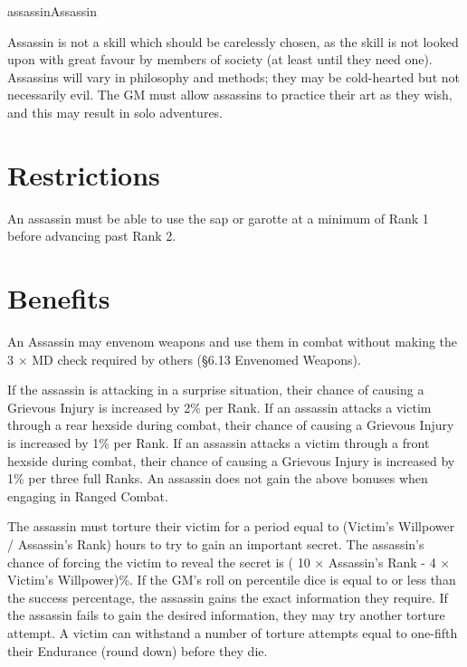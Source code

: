 \begin{Skill}{assassin}{Assassin}

Assassin is not a skill which should be carelessly chosen, as the
skill is not looked upon with great favour by members of society (at
least until they need one).  Assassins will vary in philosophy and
methods; they may be cold-hearted but not necessarily evil.  The GM
must allow assassins to practice their art as they wish, and this may
result in solo adventures.

\section{Restrictions}

An assassin must be able to use the sap or garotte at a minimum of
Rank 1 before advancing past Rank 2.

\section{Benefits}


An Assassin may envenom weapons and use them in combat without making
the 3 × MD check required by others (§6.13 Envenomed Weapons).


If the assassin is attacking in a surprise situation, their chance of
causing a Grievous Injury is increased by 2\% per Rank.  If an
assassin attacks a victim through a rear hexside during combat, their
chance of causing a Grievous Injury is increased by 1\% per Rank.  If
an assassin attacks a victim through a front hexside during combat,
their chance of causing a Grievous Injury is increased by 1\% per
three full Ranks. An assassin does not gain the above bonuses when
engaging in Ranged Combat.



The assassin must torture their victim for a period equal to (Victim’s
Willpower / Assassin’s Rank) hours to try to gain an important
secret. The assassin’s chance of forcing the victim to reveal the
secret is ( 10 × Assassin’s Rank - 4 × Victim’s Willpower)\%.  If the
GM’s roll on percentile dice is equal to or less than the success
percentage, the assassin gains the exact information they require. If
the assassin fails to gain the desired information, they may try
another torture attempt. A victim can withstand a number of torture
attempts equal to one-fifth their Endurance (round down) before they
die.


\end{Skill}
